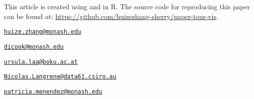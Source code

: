 This article is created using \citep{knitr} and
 \citep{rmarkdown} in R. The source code for
reproducing this paper can be found at:
\url{https://github.com/huizezhang-sherry/paper-tour-vis}.

\clearpage




\address{%
H.Sherry Zhang\\
Monash University\\
Department of Econometrics and Business Statistics\\
}
\href{mailto:huize.zhang@monash.edu}{\nolinkurl{huize.zhang@monash.edu}}

\address{%
Dianne Cook\\
Monash University\\
Department of Econometrics and Business Statistics\\
}
\href{mailto:dicook@monash.edu}{\nolinkurl{dicook@monash.edu}}

\address{%
Ursula Laa\\
University of Natural Resources and Life Sciences\\
Institute of Statistics\\
}
\href{mailto:ursula.laa@boku.ac.at}{\nolinkurl{ursula.laa@boku.ac.at}}

\address{%
Nicolas Langrené\\
Data61 CSIRO\\
Locked Bag 38004 Docklands VIC 8012 Australia\\
}
\href{mailto:Nicolas.Langrene@data61.csiro.au}{\nolinkurl{Nicolas.Langrene@data61.csiro.au}}

\address{%
Patricia Menéndez\\
Monash University\\
Department of Econometrics and Business Statistics\\
}
\href{mailto:patricia.menendez@monash.edu}{\nolinkurl{patricia.menendez@monash.edu}}

